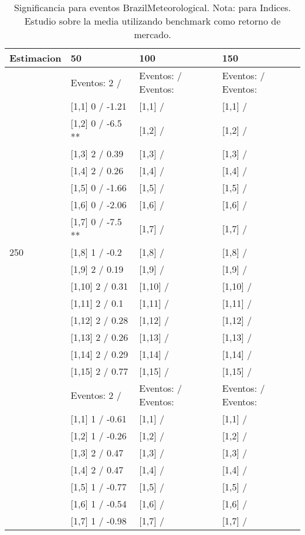 \begin{table}

\caption{Significancia para eventos BrazilMeteorological. Nota: para Indices. Estudio sobre la media utilizando benchmark como retorno de mercado.}
\centering
\begin{tabular}[t]{llll}
\toprule
Estimacion & 50 & 100 & 150\\
\midrule
 & Eventos:  2 / & Eventos:   / Eventos: & Eventos:   / Eventos:\\
 & {}[1,1] 0  / -1.21 & {}[1,1]  / & {}[1,1]  /\\
 & {}[1,2] 0  / -6.5 ** & {}[1,2]  / & {}[1,2]  /\\
 & {}[1,3] 2  / 0.39 & {}[1,3]  / & {}[1,3]  /\\
 & {}[1,4] 2  / 0.26 & {}[1,4]  / & {}[1,4]  /\\
\addlinespace
 & {}[1,5] 0  / -1.66 & {}[1,5]  / & {}[1,5]  /\\
 & {}[1,6] 0  / -2.06 & {}[1,6]  / & {}[1,6]  /\\
 & {}[1,7] 0  / -7.5 ** & {}[1,7]  / & {}[1,7]  /\\
250 & {}[1,8] 1  / -0.2 & {}[1,8]  / & {}[1,8]  /\\
 & {}[1,9] 2  / 0.19 & {}[1,9]  / & {}[1,9]  /\\
\addlinespace
 & {}[1,10] 2  / 0.31 & {}[1,10]  / & {}[1,10]  /\\
 & {}[1,11] 2  / 0.1 & {}[1,11]  / & {}[1,11]  /\\
 & {}[1,12] 2  / 0.28 & {}[1,12]  / & {}[1,12]  /\\
 & {}[1,13] 2  / 0.26 & {}[1,13]  / & {}[1,13]  /\\
 & {}[1,14] 2  / 0.29 & {}[1,14]  / & {}[1,14]  /\\
\addlinespace
 & {}[1,15] 2  / 0.77 & {}[1,15]  / & {}[1,15]  /\\
 & Eventos:  2 / & Eventos:   / Eventos: & Eventos:   / Eventos:\\
 & {}[1,1] 1  / -0.61 & {}[1,1]  / & {}[1,1]  /\\
 & {}[1,2] 1  / -0.26 & {}[1,2]  / & {}[1,2]  /\\
 & {}[1,3] 2  / 0.47 & {}[1,3]  / & {}[1,3]  /\\
\addlinespace
 & {}[1,4] 2  / 0.47 & {}[1,4]  / & {}[1,4]  /\\
 & {}[1,5] 1  / -0.77 & {}[1,5]  / & {}[1,5]  /\\
 & {}[1,6] 1  / -0.54 & {}[1,6]  / & {}[1,6]  /\\
 & {}[1,7] 1  / -0.98 & {}[1,7]  / & {}[1,7]  /\\

\end{tabular}
\end{table}

